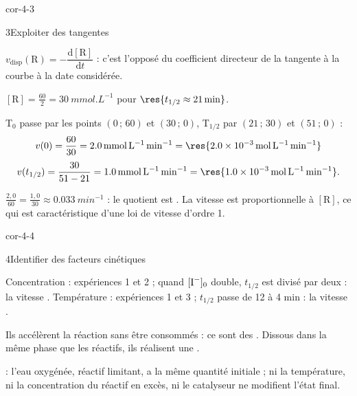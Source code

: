 \begin{blocLivre}{cor-4-3}
\begin{corrige}{3}{Exploiter des tangentes}
\begin{questions}
\item $v_\mathrm{disp}(\mathrm{R})=-\dfrac{\mathrm{d}[\mathrm{R}]}{\mathrm{d}t}$ : c'est l'opposé du coefficient
directeur de la tangente à la courbe à la date considérée.
\item $[\mathrm{R}]=\frac{60}{2}=\qty{30}{mmol.L^{-1}}$ pour $\res{t_{1/2}\approx\qty{21}{min}}$.
\item T$_0$ passe par les points $(0\,;\,60)$ et $(30\,;\,0)$, T$_{1/2}$ par $(21\,;\,30)$ et $(51\,;\,0)$ :
\[v(0)=\frac{60}{30}=\qty{2,0}{mmol.L^{-1}.min^{-1}}=\res{\qty{2,0e-3}{mol.L^{-1}.min^{-1}}}\]
\[v(t_{1/2})=\frac{30}{51-21}=\qty{1,0}{mmol.L^{-1}.min^{-1}}=\res{\qty{1,0e-3}{mol.L^{-1}.min^{-1}}}.\]
\item $\frac{2{,}0}{60}=\frac{1{,}0}{30}\approx\qty{0,033}{min^{-1}}$ : le quotient est . La vitesse
est proportionnelle à $[\mathrm{R}]$, ce qui est caractéristique d'une loi de vitesse d'ordre 1.
\end{questions}
\end{corrige}
\end{blocLivre}
\begin{blocLivre}{cor-4-4}
\begin{corrige}{4}{Identifier des facteurs cinétiques}
\begin{questions}
\item Concentration : expériences 1 et 2 ; quand $[\ce{I-}]_0$ double, $t_{1/2}$ est divisé par deux : la vitesse
. Température : expériences 1 et 3 ; $t_{1/2}$ passe de 12 à 4 min : la
vitesse .
\item Ils accélèrent la réaction sans être consommés : ce sont des . Dissous dans la même
phase que les réactifs, ils réalisent une .
\item {} : l'eau oxygénée, réactif limitant, a la même quantité initiale ; ni la température, ni la
concentration du réactif en excès, ni le catalyseur ne modifient l'état final.
\end{questions}
\end{corrige}
\end{blocLivre}
